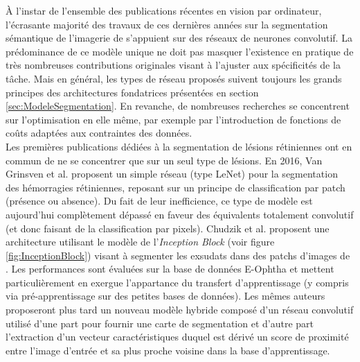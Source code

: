 À l'instar de l'ensemble des publications récentes en vision par ordinateur, l'écrasante majorité des travaux de ces dernières années sur la segmentation sémantique de l'imagerie de 
\fundus{} s'appuient sur des réseaux de neurones convolutif. La prédominance de ce modèle unique ne doit pas masquer l'existence en pratique de très nombreuses contributions originales visant à l'ajuster aux spécificités de la tâche. Mais en général, les types de réseau proposés suivent toujours les grands principes des architectures fondatrices présentées en section \ref{sec:ModeleSegmentation}. En revanche, de nombreuses recherches se concentrent sur l'optimisation en elle même, par exemple par l'introduction de fonctions de coûts adaptées aux contraintes des données.
\\ 
Les premières publications dédiées à la segmentation de lésions rétiniennes ont en commun de ne se concentrer que sur un seul type de lésions. En 2016, Van Grinsven et al. \cite{vangrinsvenFastConvolutionalNeural2016} proposent un simple réseau (type LeNet) pour la segmentation des hémorragies rétiniennes, reposant sur un principe de classification par patch (présence ou absence). Du fait de leur inefficience, ce type de modèle est aujourd'hui complètement dépassé en faveur des équivalents totalement convolutif (et donc faisant de la classification par pixels). Chudzik et al. \cite{chudzikExudateSegmentationUsing2018} proposent une architecture utilisant le modèle de l'\textit{Inception Block} (voir figure \ref{fig:InceptionBlock}) visant à segmenter les exsudats dans des patchs d'images de \fundus{}. Les performances sont évaluées sur la base de données E-Ophtha et mettent particulièrement en exergue l'appartance du transfert d'apprentissage (y compris via pré-apprentissage sur des petites bases de données). Les mêmes auteurs proposeront plus tard \cite{chudzikExudatesSegmentationUsing2018} un nouveau modèle hybride composé d'un réseau convolutif utilisé d'une part pour fournir une carte de segmentation et d'autre part l'extraction d'un vecteur caractéristiques duquel est dérivé un score de proximité entre l'image d'entrée et sa plus proche voisine dans la base d'apprentissage. 
\\
